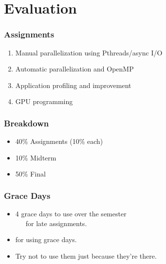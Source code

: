 \documentclass[aspectratio=43]{beamer}
\newenvironment{changemargin}[1]{%
  \begin{list}{}{%
    \setlength{\topsep}{0pt}%
    \setlength{\leftmargin}{#1}%
    \setlength{\rightmargin}{1em}
    \setlength{\listparindent}{\parindent}%
    \setlength{\itemindent}{\parindent}%
    \setlength{\parsep}{\parskip}%
  }%
  \item[]}{\end{list}}
\begin{document}
\section{Evaluation}
\begin{frame}
  \frametitle{Assignments}

  \begin{enumerate}
    \item Manual parallelization using Pthreads/async I/O
    \vfill
    \item Automatic parallelization and OpenMP
    \vfill
    \item Application profiling and improvement
    \vfill
    \item GPU programming
  \end{enumerate}
\end{frame}

\begin{frame}
  \frametitle{Breakdown}

  \begin{itemize}
    \item 40\% Assignments (10\% each)
    \vfill
    \item 10\% Midterm
    \vfill
    \item 50\% Final
  \end{itemize}
\end{frame}

\begin{frame}
  \frametitle{Grace Days}

  \begin{changemargin}{2em}
  \begin{itemize}
    \item 4 grace days to use over the semester \\ ~~~for late assignments.
    \vfill
    \item {} for using grace days.
    \vfill
    \item Try not to use them just because they're there.
  \end{itemize}
  \end{changemargin}
\end{frame}
\end{document}
